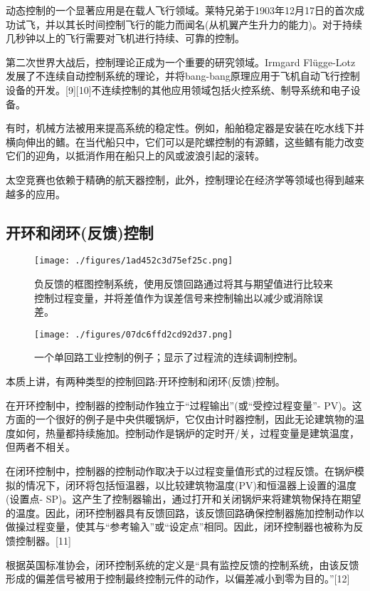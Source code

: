 动态控制的一个显著应用是在载人飞行领域。莱特兄弟于1903年12月17日的首次成功试飞，并以其长时间控制飞行的能力而闻名(从机翼产生升力的能力)。对于持续几秒钟以上的飞行需要对飞机进行持续、可靠的控制。

第二次世界大战后，控制理论正成为一个重要的研究领域。Irmgard Flügge-Lotz发展了不连续自动控制系统的理论，并将bang-bang原理应用于飞机自动飞行控制设备的开发。[9][10]不连续控制的其他应用领域包括火控系统、制导系统和电子设备。

有时，机械方法被用来提高系统的稳定性。例如，船舶稳定器是安装在吃水线下并横向伸出的鳍。在当代船只中，它们可以是陀螺控制的有源鳍，这些鳍有能力改变它们的迎角，以抵消作用在船只上的风或波浪引起的滚转。

太空竞赛也依赖于精确的航天器控制，此外，控制理论在经济学等领域也得到越来越多的应用。

\subsection{开环和闭环(反馈)控制}

\begin{figure}[ht]
\centering
\texttt{[image: ./figures/1ad452c3d75ef25c.png]}
\caption{负反馈的框图控制系统，使用反馈回路通过将其与期望值进行比较来控制过程变量，并将差值作为误差信号来控制输出以减少或消除误差。} \label{fig_KZLL_3}
\end{figure}

\begin{figure}[ht]
\centering
\texttt{[image: ./figures/07dc6ffd2cd92d37.png]}
\caption{一个单回路工业控制的例子；显示了过程流的连续调制控制。} \label{fig_KZLL_4}
\end{figure}

本质上讲，有两种类型的控制回路:开环控制和闭环(反馈)控制。

在开环控制中，控制器的控制动作独立于“过程输出”(或“受控过程变量”- PV)。这方面的一个很好的例子是中央供暖锅炉，它仅由计时器控制，因此无论建筑物的温度如何，热量都持续施加。控制动作是锅炉的定时开/关，过程变量是建筑温度，但两者不相关。

在闭环控制中，控制器的控制动作取决于以过程变量值形式的过程反馈。在锅炉模拟的情况下，闭环将包括恒温器，以比较建筑物温度(PV)和恒温器上设置的温度(设置点- SP)。这产生了控制器输出，通过打开和关闭锅炉来将建筑物保持在期望的温度。因此，闭环控制器具有反馈回路，该反馈回路确保控制器施加控制动作以做操过程变量，使其与“参考输入”或“设定点”相同。因此，闭环控制器也被称为反馈控制器。[11]

根据英国标准协会，闭环控制系统的定义是“具有监控反馈的控制系统，由该反馈形成的偏差信号被用于控制最终控制元件的动作，以偏差减小到零为目的。”[12]


